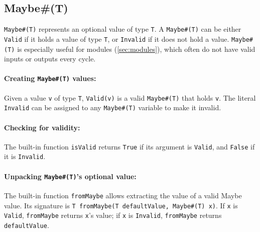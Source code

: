 \subsection{Maybe\#(T)}
\label{sec:maybe}

\verb|Maybe#(T)| represents an optional value of type \verb|T|.
A \verb|Maybe#(T)| can be either \verb|Valid| if it holds a value of type \verb|T|,
or \verb|Invalid| if it does not hold a value.
\verb|Maybe#(T)| is especially useful for modules (\autoref{sec:modules}),
which often do not have valid inputs or outputs every cycle.

\paragraph{Creating \texttt{Maybe\#(T)} values:} Given a value \verb|v| of type \verb|T|,
\verb|Valid(v)| is a valid \verb|Maybe#(T)| that holds \verb|v|.
The literal \verb|Invalid| can be assigned to any \verb|Maybe#(T)|
variable to make it invalid.

\paragraph{Checking for validity:}
The built-in function \verb|isValid| returns \verb|True| if its argument is \verb|Valid|,
and \verb|False| if it is \verb|Invalid|.

\paragraph{Unpacking \texttt{Maybe\#(T)}'s optional value:}
The built-in function \verb|fromMaybe| allows extracting the value of a valid Maybe value.
Its signature is 
\verb|T fromMaybe(T defaultValue, Maybe#(T) x)|.
If \verb|x| is \verb|Valid|, \verb|fromMaybe| returns \verb|x|'s value; if \verb|x| is \verb|Invalid|, \verb|fromMaybe| returns \verb|defaultValue|.


